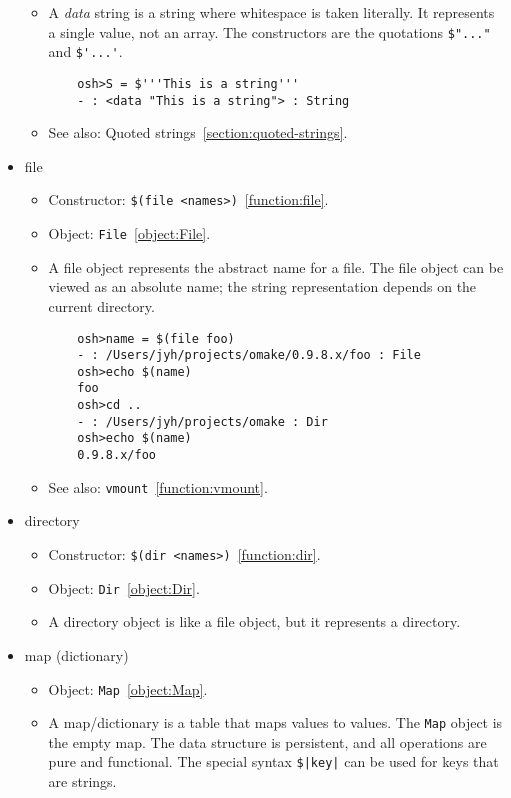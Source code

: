 \begin{itemize}
\begin{itemize}
\item A \emph{data} string is a string where whitespace is taken literally.  It represents a single value,
  not an array.  The constructors are the quotations \verb+$"..."+ and \verb+$'...'+.

\begin{verbatim}
    osh>S = $'''This is a string'''
    - : <data "This is a string"> : String
\end{verbatim}

\item See also: Quoted strings~\ref{section:quoted-strings}.
\end{itemize}

\item file

\begin{itemize}
\item Constructor: \verb+$(file <names>)+~\ref{function:file}.
\item Object: \verb+File+~\ref{object:File}.
\item A file object represents the abstract name for a file.  The file object can be viewed as an
  absolute name; the string representation depends on the current directory.

\begin{verbatim}
    osh>name = $(file foo)
    - : /Users/jyh/projects/omake/0.9.8.x/foo : File
    osh>echo $(name)
    foo
    osh>cd ..
    - : /Users/jyh/projects/omake : Dir
    osh>echo $(name)
    0.9.8.x/foo
\end{verbatim}

\item See also: \verb+vmount+~\ref{function:vmount}.
\end{itemize}

\item directory

\begin{itemize}
\item Constructor: \verb+$(dir <names>)+~\ref{function:dir}.
\item Object: \verb+Dir+~\ref{object:Dir}.
\item A directory object is like a file object, but it represents a directory.
\end{itemize}

\item map (dictionary)
\begin{itemize}
\item Object: \verb+Map+~\ref{object:Map}.
\item A map/dictionary is a table that maps values to values.  The \verb+Map+ object is the empty
  map.  The data structure is persistent, and all operations are pure and functional.  The special syntax
  \verb+$|key|+ can be used for keys that are strings.


\end{itemize}
\end{itemize}
